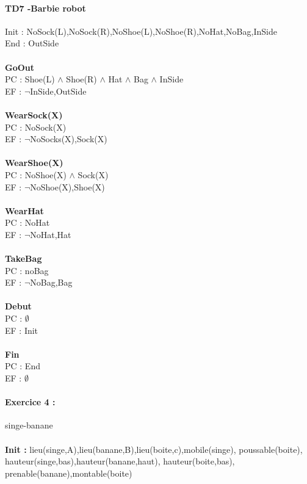 \documentclass{article}
\begin{document}
\paragraph{TD7 -Barbie robot} Init : NoSock(L),NoSock(R),NoShoe(L),NoShoe(R),NoHat,NoBag,InSide\\
End : OutSide\\\\

\textbf{GoOut}\\
PC : Shoe(L) $\wedge$ Shoe(R) $\wedge$ Hat $\wedge$ Bag $\wedge$ InSide\\
EF : $\neg$InSide,OutSide\\\\

\textbf{WearSock(X)}\\
PC : NoSock(X)\\
EF : $\neg$NoSocks(X),Sock(X) \\\\

\textbf{WearShoe(X)}\\
PC : NoShoe(X) $\wedge$ Sock(X)\\
EF : $\neg$NoShoe(X),Shoe(X)\\\\

\textbf{WearHat}\\
PC : NoHat\\
EF : $\neg$NoHat,Hat\\\\

\textbf{TakeBag}\\
PC : noBag\\
EF : $\neg$NoBag,Bag\\\\

\textbf{Debut}\\
PC : $\emptyset$\\
EF : Init\\\\

\textbf{Fin}\\
PC : End\\
EF : $\emptyset$

\newpage


\paragraph{Exercice 4 : } singe-banane \\\\
\textbf{Init : } lieu(singe,A),lieu(banane,B),lieu(boite,c),mobile(singe), poussable(boite), hauteur(singe,bas),hauteur(banane,haut), hauteur(boite,bas), prenable(banane),montable(boite)\\\\
\end{document}
